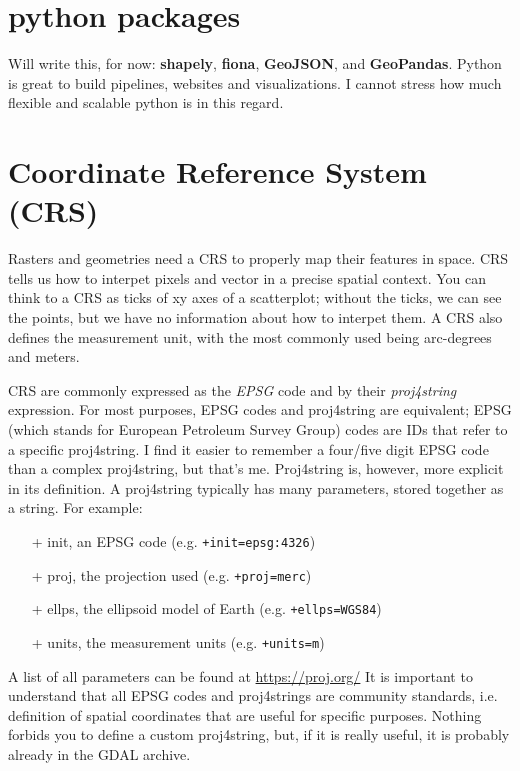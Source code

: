 \documentclass{book}
\begin{document}
\section{python packages}
Will write this, for now: \textbf{shapely}, \textbf{fiona}, \textbf{GeoJSON}, and \textbf{GeoPandas}. Python is great to build pipelines, websites and visualizations. I cannot stress how much flexible and scalable python is in this regard.

\section{Coordinate Reference System (CRS)}
Rasters and geometries need a CRS to properly map their features in space. 
CRS tells us how to interpet pixels and vector in a precise spatial context.
You can think to a CRS as ticks of xy axes of a scatterplot; without the ticks, we can see the points, but we have no information about how to interpet them. 
A CRS also defines the measurement unit, with the most commonly used being arc-degrees and meters.

CRS are commonly expressed as the \textit{EPSG} code and by their \textit{proj4string} expression. For most purposes, EPSG codes and proj4string are equivalent; EPSG (which stands for European Petroleum Survey Group) codes are IDs that refer to a specific proj4string. I find it easier to remember a four/five digit EPSG code than a complex proj4string, but that's me. Proj4string is, however, more explicit in its definition. A proj4string typically has many parameters, stored together as a string. For example:

\begin{itemize}
    \item[+] init, an EPSG code (e.g. \texttt{+init=epsg:4326})
    \item[+] proj, the projection used (e.g. \texttt{+proj=merc})
    \item[+] ellps, the ellipsoid model of Earth (e.g. \texttt{+ellps=WGS84})
    \item[+] units, the measurement units (e.g. \texttt{+units=m})
\end{itemize}

A list of all parameters can be found at \href{https://proj.org/operations/projections/tpers.html?highlight=lat\_0#parameters}{https://proj.org/} It is important to understand that all EPSG codes and proj4strings are community standards, i.e. definition of spatial coordinates that are useful for specific purposes. Nothing forbids you to define a custom proj4string, but, if it is really useful, it is probably already in the GDAL archive.
\end{document}
